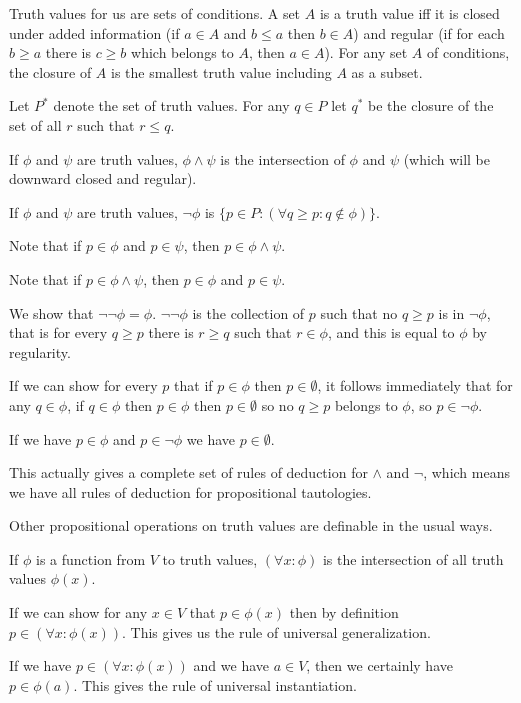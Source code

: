 \documentclass[12pt]{article}
\begin{document}
Truth values for us are sets of conditions.  A set $A$ is a truth value iff it is closed under added information (if $a \in A$ and $b \leq a$ then $b \in A$) and regular (if for each $b \geq a$ there is $c \geq b$ which belongs to $A$, then $a \in A$).  For
any set $A$ of conditions, the closure of $A$ is the smallest truth value including $A$ as a subset.

Let $P^*$ denote the set of truth values.  For any $q \in P$ let $q^*$ be the closure of the set of all $r$ such that $r \leq q$.

If $\phi$ and $\psi$ are truth values, $\phi \wedge \psi$ is the intersection of $\phi$ and $\psi$ (which will be downward closed and regular).

If $\phi$ and $\psi$ are truth values, $\neg \phi$ is $\{p \in P:(\forall q\geq p:q \not\in \phi)\}$.

Note that if $p \in \phi$ and $p \in \psi$, then $p \in \phi\wedge \psi$.

Note that if $p \in \phi \wedge \psi$, then $p \in \phi$ and $p \in \psi$.

We show that $\neg\neg \phi = \phi$.  $\neg\neg\phi$ is the collection of $p$ such that no $q \geq p$ is in $\neg\phi$, that is for every $q \geq p$ there is $r \geq q$ such that $r \in \phi$,
and this is equal to $\phi$ by regularity.

If we can show for every $p$ that if $p \in \phi$ then $p \in \emptyset$, it follows immediately that for any $q \in \phi$, if $q \in \phi$ then $p \in \phi$ then $p \in \emptyset$ so no $q \geq p$ belongs to $\phi$, so $p \in \neg\phi$.

If we have $p \in \phi$ and $p \in \neg \phi$ we have $p \in \emptyset$.

This actually gives a complete set of rules of deduction for $\wedge$ and $\neg$, which means we have all rules of deduction for propositional tautologies.

Other propositional operations on truth values are definable in the usual ways.

If $\phi$ is a function from $V$ to truth values, $(\forall x:\phi)$ is the intersection of all truth values $\phi(x)$.

If we can show for any $x \in V$ that $p \in \phi(x)$ then by definition $p \in (\forall x:\phi(x))$.  This gives us the rule of universal generalization.

If we have $p \in (\forall x:\phi(x))$ and we have $a \in V$, then we certainly have $p \in \phi(a)$.  This gives the rule of universal instantiation.
\end{document}
